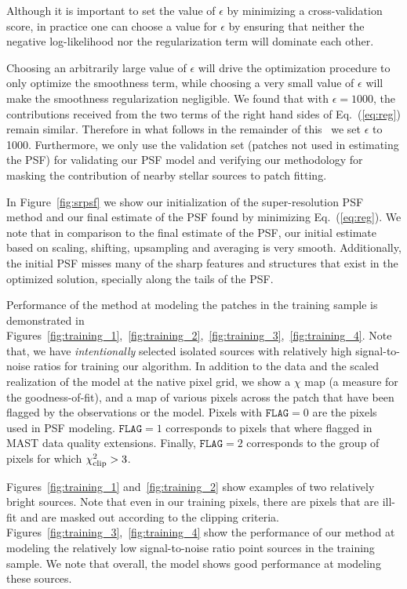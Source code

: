Although it is important to set the value of $\epsilon$ by minimizing a cross-validation score, in practice one can choose a 
value for $\epsilon$ by ensuring that neither the negative log-likelihood nor the regularization term will dominate each other. 

Choosing an arbitrarily large value of $\epsilon$ will drive the optimization procedure to only optimize the smoothness term, while choosing a very small 
value of $\epsilon$ will make the smoothness regularization negligible. We found that with $\epsilon = 1000$, the contributions received from the two terms 
of the right hand sides of Eq.~(\ref{eq:reg}) remain similar. Therefore in what follows in the remainder of this \paper\ we set $\epsilon$  to 1000.
Furthermore, we only use the validation set (patches not used in estimating the PSF) for validating our PSF model and verifying our 
methodology for masking the contribution of nearby stellar sources to patch fitting.  

In Figure~\ref{fig:srpsf} we show our initialization of the super-resolution PSF method and our final estimate of the PSF found by
minimizing Eq.~(\ref{eq:reg}). We note that in comparison to the final estimate of the PSF, our initial estimate based on scaling, shifting, 
upsampling and averaging is very smooth. Additionally, the initial PSF misses many of the sharp features and structures that exist in the optimized solution, specially along the tails of the PSF.

Performance of the method at modeling the patches in the training sample is demonstrated in Figures~\ref{fig:training_1},~\ref{fig:training_2},~\ref{fig:training_3},~\ref{fig:training_4}. 
Note that, we have \emph{intentionally} selected isolated sources with relatively high signal-to-noise ratios for training our algorithm. In addition to the data and the scaled realization of the model at the native pixel grid, we show a $\chi$ map (a measure for the goodness-of-fit), and a map of various pixels across the patch that have been flagged by the observations or the model. Pixels with $\mathtt{FLAG}=0$ are the pixels used in PSF modeling. $\mathtt{FLAG}=1$ corresponds to pixels that where flagged in MAST data quality extensions. Finally, $\mathtt{FLAG}=2$ corresponds to the group of pixels for which $\chi^{2}_{\rm clip}>3$. 

Figures~\ref{fig:training_1} and~\ref{fig:training_2} show examples of two relatively bright sources. Note that even in our training pixels, there are pixels that are ill-fit and are masked out according to the clipping criteria. Figures~\ref{fig:training_3},~\ref{fig:training_4} show the performance of our method at modeling the relatively low signal-to-noise ratio point sources in the training sample. We note that overall, the model shows good performance at modeling these sources.

